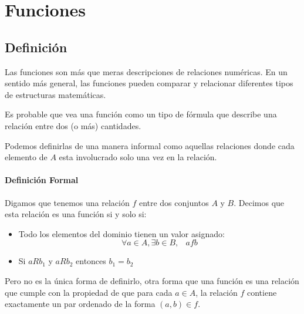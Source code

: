 \documentclass[12pt]{report}                                    %
\DeclareMathOperator \Space {\quad}                             %
\DeclareMathOperator \MiniSpace {\;}                            %
\begin{document}
\chapter{Funciones}
    \clearpage    



    \section{Definición}

        Las funciones son más que meras descripciones de relaciones numéricas. En un sentido más general,
        las funciones pueden comparar y relacionar diferentes tipos de estructuras matemáticas.

        Es probable que vea una función como un tipo de fórmula que describe una relación entre dos
        (o más) cantidades.

        Podemos definirlas de una manera informal como aquellas relaciones donde cada elemento de $A$ 
        esta involucrado solo una vez en la relación.

        \subsubsection*{Definición Formal}

        Digamos que tenemos una relación $f$ entre dos conjuntos $A$ y $B$.
        Decimos que esta relación es una función si y solo si:

        \begin{itemize}
            \item Todo los elementos del dominio tienen un valor asignado:
                \begin{equation}
                    \forall a \in A, \exists b \in B, \MiniSpace afb
                \end{equation}

            \item Si $aRb_1$ y $aRb_2$ entonces $b_1 = b_2$

        \end{itemize}

        Pero no es la única forma de definirlo, otra forma que una función es una relación que 
        cumple con la propiedad de que para cada $a \in A$, la relación $f$ contiene exactamente
        un par ordenado de la forma $(a,b) \in f$.
\end{document}
